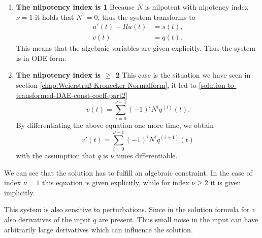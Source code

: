 \begin{enumerate}
	\item \textbf{The nilpotency index is 1} \newline
		Because $N$ is nilpotent with nipotency index $\nu = 1$ it holds that $N^1 = 0$, thus the system transforms to
		\begin{align*}
			u'(t) + Ru(t) &= s(t), \\
			v(t) &= q(t).
		\end{align*}
		This means that the algebraic variables are given explicitly. Thus the system is in ODE form.

	\item \textbf{The nilpotency index is $\geq$ 2} \newline
		This case is the situation we have seen in section \ref{chap:Weierstraß-Kronecker Normalform}, it led to \eqref{solution-to-transformed-DAE-const-coeff-part2}
		\begin{displaymath}
			v(t) = \sum_{i=0}^{\nu-1} (-1)^iN^iq^{(i)}(t).
		\end{displaymath}
		By differentiating the above equation one more time, we obtain
		\begin{equation}
			v'(t) = \sum_{i=0}^{\nu-1} (-1)^iN^iq^{(i+1)}(t)
		\end{equation}
		with the assumption that $q$ is $\nu$ times differentiable.
\end{enumerate}

We can see that the solution has to fulfill an algebraic constraint. In the case of index $\nu = 1$ this equation is given explicitly, while for index $\nu \geq 2$ it is given implicitly.

This system is also sensitive to perturbations. Since in the solution formula for $v$ also derivatives of the input $q$ are present. Thus small noise in the input can have arbitrarily large derivatives which can influence the solution.



